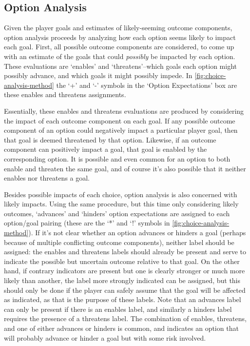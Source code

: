 \subsection{Option Analysis}

\label{sec:cp-option-analysis}

Given the player goals and estimates of likely-seeming outcome components, option analysis proceeds by analyzing how each option seems likely to impact each goal.
%
First, all possible outcome components are considered, to come up with an estimate of the goals that could \emph{possibly} be impacted by each option.
%
These evaluations are `enables' and `threatens'--which goals each option might possibly advance, and which goals it might possibly impede.
%
In \cref{fig:choice-analysis-method} the `+' and `-' symbols in the `Option Expectations' box are these enables and threatens assignments.


Essentially, these enables and threatens evaluations are produced by considering the impact of each outcome component on each goal.
%
If any possible outcome component of an option could negatively impact a particular player goal, then that goal is deemed threatened by that option.
%
Likewise, if an outcome component can positively impact a goal, that goal is enabled by the corresponding option.
%
It is possible and even common for an option to both enable and threaten the same goal, and of course it's also possible that it neither enables nor threatens a goal.


Besides possible impacts of each choice, option analysis is also concerned with likely impacts.
%
Using the same procedure, but this time only considering likely outcomes, `advances' and `hinders' option expectations are assigned to each option/goal pairing (these are the `*' and `!' symbols in \cref{fig:choice-analysis-method}).
%
If it's not clear whether an option advances or hinders a goal (perhaps because of multiple conflicting outcome components), neither label should be assigned: the enables and threatens labels should already be present and serve to indicate the possible but uncertain outcome relative to that goal.
%
On the other hand, if contrary indicators are present but one is clearly stronger or much more likely than another, the label more strongly indicated can be assigned, but this should only be done if the player can safely assume that the goal will be affected as indicated, as that is the purpose of these labels.
%
Note that an advances label can only be present if there is an enables label, and similarly a hinders label requires the presence of a threatens label.
%
The combination of enables, threatens, and one of either advances or hinders is common, and indicates an option that will probably advance or hinder a goal but with some risk involved.


